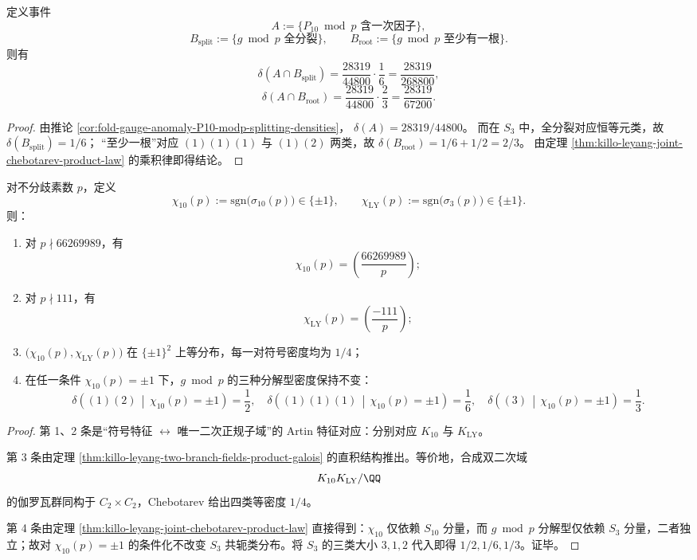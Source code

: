 \begin{corollary}[联合事件的显式密度]\label{cor:killo-leyang-joint-density-explicit}
定义事件
\[
A:=\{\text{\(P_{10}\bmod p\) 含一次因子}\},
\]
\[
B_{\mathrm{split}}:=\{\text{\(g\bmod p\) 全分裂}\},
\qquad
B_{\mathrm{root}}:=\{\text{\(g\bmod p\) 至少有一根}\}.
\]
则有
\[
\delta(A\cap B_{\mathrm{split}})
=\frac{28319}{44800}\cdot\frac{1}{6}
=\frac{28319}{268800},
\]
\[
\delta(A\cap B_{\mathrm{root}})
=\frac{28319}{44800}\cdot\frac{2}{3}
=\frac{28319}{67200}.
\]
\end{corollary}
\begin{proof}
由推论 \ref{cor:fold-gauge-anomaly-P10-modp-splitting-densities}，
\(
\delta(A)=28319/44800
\)。
而在 \(S_3\) 中，全分裂对应恒等元类，故
\(
\delta(B_{\mathrm{split}})=1/6
\)；
“至少一根”对应 \((1)(1)(1)\) 与 \((1)(2)\) 两类，故
\(
\delta(B_{\mathrm{root}})=1/6+1/2=2/3
\)。
由定理 \ref{thm:killo-leyang-joint-chebotarev-product-law} 的乘积律即得结论。
\end{proof}

\begin{theorem}[判别式二次特征的解耦与条件密度不变性]\label{thm:killo-leyang-quadratic-character-decoupling}
对不分歧素数 \(p\)，定义
\[
\chi_{10}(p):=\mathrm{sgn}\!\bigl(\sigma_{10}(p)\bigr)\in\{\pm1\},
\qquad
\chi_{\mathrm{LY}}(p):=\mathrm{sgn}\!\bigl(\sigma_{3}(p)\bigr)\in\{\pm1\}.
\]
则：
\begin{enumerate}
  \item 对 \(p\nmid 66269989\)，有
  \[
  \chi_{10}(p)=\left(\frac{66269989}{p}\right);
  \]
  \item 对 \(p\nmid 111\)，有
  \[
  \chi_{\mathrm{LY}}(p)=\left(\frac{-111}{p}\right);
  \]
  \item \(\bigl(\chi_{10}(p),\chi_{\mathrm{LY}}(p)\bigr)\) 在 \(\{\pm1\}^2\) 上等分布，每一对符号密度均为 \(1/4\)；
  \item 在任一条件 \(\chi_{10}(p)=\pm1\) 下，\(g\bmod p\) 的三种分解型密度保持不变：
  \[
  \delta\!\left((1)(2)\,\middle|\,\chi_{10}(p)=\pm1\right)=\frac12,\quad
  \delta\!\left((1)(1)(1)\,\middle|\,\chi_{10}(p)=\pm1\right)=\frac16,\quad
  \delta\!\left((3)\,\middle|\,\chi_{10}(p)=\pm1\right)=\frac13.
  \]
\end{enumerate}
\end{theorem}
\begin{proof}
第 1、2 条是“符号特征 \(\leftrightarrow\) 唯一二次正规子域”的 Artin 特征对应：分别对应 \(K_{10}\) 与 \(K_{\mathrm{LY}}\)。

第 3 条由定理 \ref{thm:killo-leyang-two-branch-fields-product-galois} 的直积结构推出。等价地，合成双二次域
\[
K_{10}K_{\mathrm{LY}}/\QQ
\]
的伽罗瓦群同构于 \(C_2\times C_2\)，Chebotarev 给出四类等密度 \(1/4\)。

第 4 条由定理 \ref{thm:killo-leyang-joint-chebotarev-product-law} 直接得到：\(\chi_{10}\) 仅依赖 \(S_{10}\) 分量，而 \(g\bmod p\) 分解型仅依赖 \(S_3\) 分量，二者独立；故对 \(\chi_{10}(p)=\pm1\) 的条件化不改变 \(S_3\) 共轭类分布。将 \(S_3\) 的三类大小 \(3,1,2\) 代入即得 \(1/2,1/6,1/3\)。证毕。
\end{proof}

